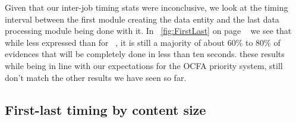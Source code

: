 Given that our inter-job timing stats were inconclusive, we look at the timing interval between the first module creating the data entity and the last data processing module being done with it. In ~\ref{fig:FirstLast} on page ~\pageref{fig:FirstLast} we see that while less expressed than for ~\pageref{fig:InterJob}, it is still a majority of about 60\% to 80\% of evidences that will be completely done in less than ten seconds. these results while being in line with our expectations for the OCFA priority system, still don't match the other results we have seen so far.
\subsection{First-last timing by content size}
\begin{figure}
\centering
{}
\hspace{0mm}
\end{figure}
